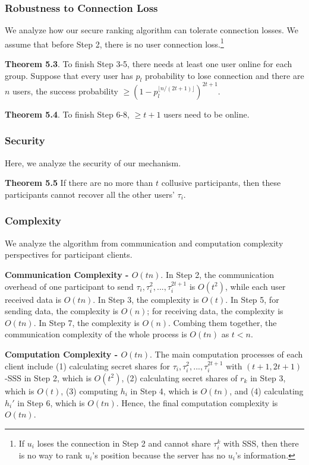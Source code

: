 \subsubsection{Robustness to Connection Loss} We analyze how our secure ranking algorithm can tolerate connection losses. We assume that before Step 2, there is no user connection loss.\footnote{If $u_i$ loses the connection in Step 2 and cannot share $\tau_i^k$ with SSS, then there is no way to rank $u_i$'s position because the server has no $u_i$'s information.}

\vspace{+.5em}
\textbf{Theorem 5.3}. To finish Step 3-5, there needs at least one user online for each group. Suppose that every user has $p_l$ probability to lose connection and there are $n$ users, the success probability $\ge (1-p_l^{\lfloor n/(2t+1) \rfloor})^{2t+1}$.


\vspace{+.5em}
\textbf{Theorem 5.4}. To finish Step 6-8, $\ge t+1$ users need to be online.



\subsubsection{Security} Here, we analyze the security of our mechanism.

\vspace{+.5em}
\textbf{Theorem 5.5} If there are no more than $t$ collusive participants, then these participants cannot recover all the other users' $\tau_i$.






\subsubsection{Complexity} We analyze the algorithm from communication and computation complexity perspectives for participant clients.

\textbf{Communication Complexity - $O(tn)$}. In Step 2, the communication overhead of one participant to send $\tau_i,\tau_i^2,...,\tau_i^{2t+1}$ is $O(t^2)$, while each user received data is $O(tn)$. In Step 3, the complexity is $O(t)$. In Step 5, for sending data, the complexity is $O(n)$; for receiving data, the complexity is $O(tn)$. In Step 7, the complexity is $O(n)$. Combing them together, the communication complexity of the whole process is $O(tn)$ as $t<n$.


\textbf{Computation Complexity - $O(tn)$}. The main computation processes of each client include (1) calculating secret shares for $\tau_i,\tau_i^2,...,\tau_i^{2t+1}$ with $(t+1, 2t+1)$-SSS in Step 2, which is $O(t^2)$, (2) calculating secret shares of $r_k$ in Step 3, which is $O(t)$, (3) computing  $h_i$ in Step 4, which is $O(tn)$, and (4) calculating $h_i'$ in Step 6, which is $O(tn)$. Hence, the final computation complexity is $O(tn)$.

